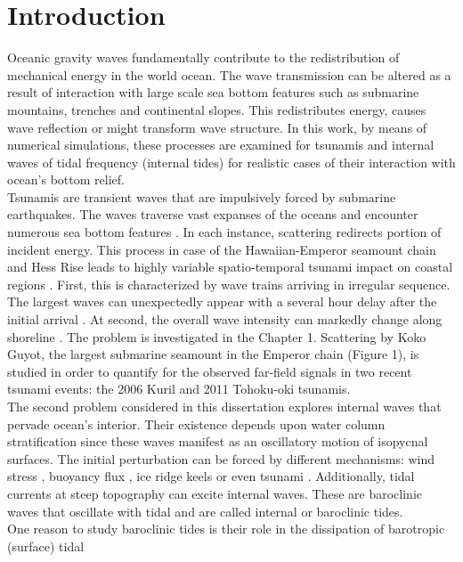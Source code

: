 \documentclass[12pt]{article}
\begin{document}
\newpage
\section{Introduction}
Oceanic gravity waves fundamentally contribute to the redistribution of mechanical energy in the 
world ocean. The wave transmission can be altered as a result of interaction with large scale 
sea bottom features such as submarine mountains, trenches and continental slopes. This 
redistributes energy, causes wave reflection or might transform wave structure. In this work, by 
means of numerical simulations, these processes are examined for tsunamis and internal waves of 
tidal frequency (internal tides) for realistic cases of their interaction with ocean's bottom 
relief.\\
Tsunamis are transient waves that are impulsively forced by submarine earthquakes. The waves 
traverse vast expanses of the oceans and encounter numerous sea bottom features 
\citep{mofjeld2001tsunami}. In each instance, scattering redirects portion of incident energy. This 
process in case of the Hawaiian-Emperor seamount chain and Hess Rise leads to highly variable 
spatio-temporal tsunami impact on coastal regions \citep{kowalik2008kuril, tang2012direct}. First, 
this is characterized by wave trains arriving in irregular sequence. The largest waves can 
unexpectedly appear with a several hour delay after the initial arrival 
\citep{koshimura2008effect}. At second, the overall wave intensity can markedly change along 
shoreline \citep{Borrero2013}. The problem is investigated in the Chapter 1. Scattering by Koko 
Guyot, the largest submarine seamount in the Emperor chain (Figure 1), is studied in order to 
quantify for the observed far-field signals in two recent tsunami events: the 2006 Kuril and 2011 
Tohoku-oki tsunamis.\\
The second problem considered in this dissertation explores internal waves that pervade ocean's 
interior. Their existence depends upon water column stratification since these waves manifest as an 
oscillatory motion of isopycnal surfaces. The initial perturbation can be forced by different 
mechanisms: wind stress \citep{garrett2001near}, buoyancy flux \citep{garrett1979internal}, ice 
ridge keels \citep{morison1986internal} or even tsunami \citep{santek2007satellite}. Additionally, 
tidal currents at steep topography can excite internal waves. These are baroclinic waves 
that oscillate with tidal and are called internal or baroclinic tides.\\
One reason to study baroclinic tides is their role in the dissipation of barotropic (surface) tidal 
\end{document}
